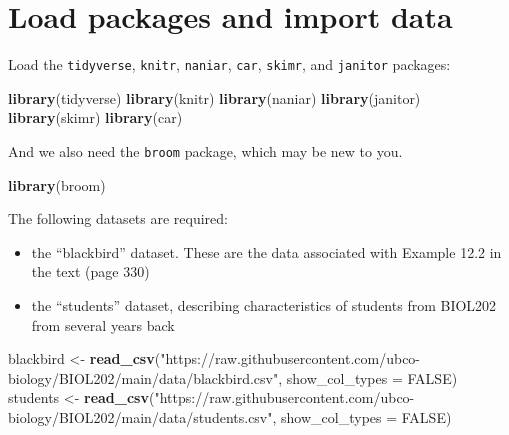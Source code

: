 \documentclass[
]{book}
\newenvironment{Shaded}{\begin{snugshade}}{\end{snugshade}}
\newcommand{\AttributeTok}[1]{\textcolor[rgb]{0.13,0.29,0.53}{#1}}
\newcommand{\ConstantTok}[1]{\textcolor[rgb]{0.56,0.35,0.01}{#1}}
\newcommand{\FunctionTok}[1]{\textcolor[rgb]{0.13,0.29,0.53}{\textbf{#1}}}
\newcommand{\NormalTok}[1]{#1}
\newcommand{\OtherTok}[1]{\textcolor[rgb]{0.56,0.35,0.01}{#1}}
\newcommand{\StringTok}[1]{\textcolor[rgb]{0.31,0.60,0.02}{#1}}
\providecommand{\tightlist}{%
  \setlength{\itemsep}{0pt}\setlength{\parskip}{0pt}}
\begin{document}
\section{Load packages and import data}\label{twomean_packages_data}

Load the \texttt{tidyverse}, \texttt{knitr}, \texttt{naniar}, \texttt{car}, \texttt{skimr}, and \texttt{janitor} packages:

\begin{Shaded}
\begin{Highlighting}[]
\FunctionTok{library}\NormalTok{(tidyverse)}
\FunctionTok{library}\NormalTok{(knitr)}
\FunctionTok{library}\NormalTok{(naniar)}
\FunctionTok{library}\NormalTok{(janitor)}
\FunctionTok{library}\NormalTok{(skimr)}
\FunctionTok{library}\NormalTok{(car)}
\end{Highlighting}
\end{Shaded}

And we also need the \texttt{broom} package, which may be new to you.

\begin{Shaded}
\begin{Highlighting}[]
\FunctionTok{library}\NormalTok{(broom)}
\end{Highlighting}
\end{Shaded}

The following datasets are required:

\begin{itemize}
\tightlist
\item
  the ``blackbird'' dataset. These are the data associated with Example 12.2 in the text (page 330)
\item
  the ``students'' dataset, describing characteristics of students from BIOL202 from several years back
\end{itemize}

\begin{Shaded}
\begin{Highlighting}[]
\NormalTok{blackbird }\OtherTok{\textless{}{-}} \FunctionTok{read\_csv}\NormalTok{(}\StringTok{"https://raw.githubusercontent.com/ubco{-}biology/BIOL202/main/data/blackbird.csv"}\NormalTok{, }\AttributeTok{show\_col\_types =} \ConstantTok{FALSE}\NormalTok{)}
\NormalTok{students }\OtherTok{\textless{}{-}} \FunctionTok{read\_csv}\NormalTok{(}\StringTok{"https://raw.githubusercontent.com/ubco{-}biology/BIOL202/main/data/students.csv"}\NormalTok{, }\AttributeTok{show\_col\_types =} \ConstantTok{FALSE}\NormalTok{)}
\end{Highlighting}
\end{Shaded}
\end{document}
